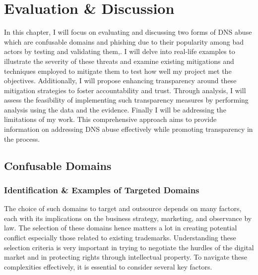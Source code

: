 \chapter{Evaluation \& Discussion}

In this chapter, I will focus on evaluating and discussing two forms of DNS abuse which are confusable domains and phishing due to their popularity among bad actors by testing and validating them,. I will delve into real-life examples to illustrate the severity of these threats and examine existing mitigations and techniques employed to mitigate them to test how well my project met the objectives. Additionally, I will propose enhancing transparency around these mitigation strategies to foster accountability and trust. Through analysis, I will assess the feasibility of implementing such transparency measures by performing analysis using the data and the evidence. Finally I will be addressing the limitations of my work. This comprehensive approach aims to provide information on addressing DNS abuse effectively while promoting transparency in the process. 


\section{Confusable Domains}
\subsection{Identification \& Examples of Targeted Domains}

The choice of such domains to target and outsource depends on many factors, each with its implications on the business strategy, marketing, and observance by law. The selection of these domains hence matters a lot in creating potential conflict especially those related to existing trademarks. Understanding these selection criteria is very important in trying to negotiate the hurdles of the digital market and in protecting rights through intellectual property. To navigate these complexities effectively, it is essential to consider several key factors. 

